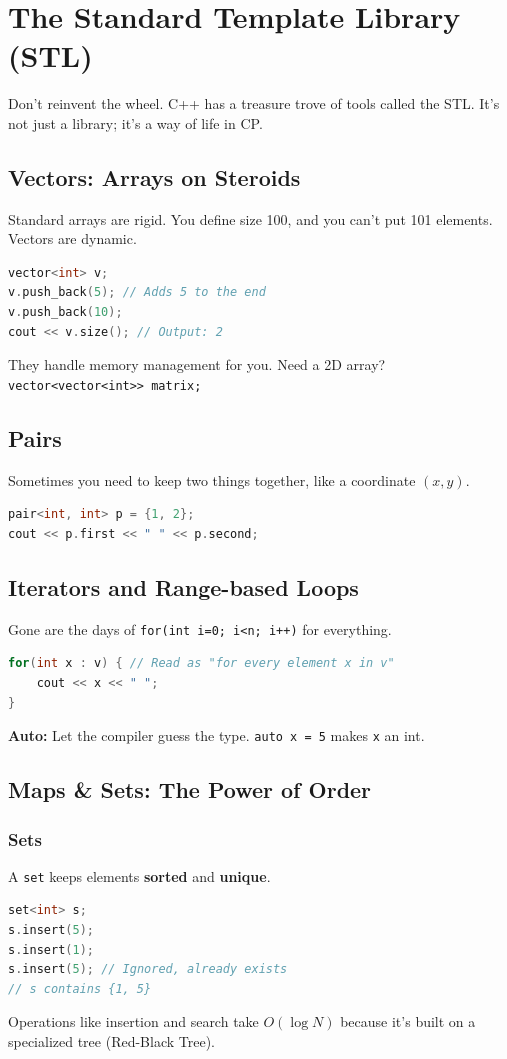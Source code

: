 \documentclass[12pt, a4paper]{report}
\begin{document}
\chapter{The Standard Template Library (STL)}
Don't reinvent the wheel. C++ has a treasure trove of tools called the STL. It's not just a library; it's a way of life in CP.

\section{Vectors: Arrays on Steroids}
Standard arrays are rigid. You define size 100, and you can't put 101 elements. Vectors are dynamic.
\begin{lstlisting}[language=C++]
vector<int> v; 
v.push_back(5); // Adds 5 to the end
v.push_back(10);
cout << v.size(); // Output: 2
\end{lstlisting}
They handle memory management for you. Need a 2D array?
\texttt{vector<vector<int>> matrix;}

\section{Pairs}
Sometimes you need to keep two things together, like a coordinate $(x, y)$.
\begin{lstlisting}[language=C++]
pair<int, int> p = {1, 2};
cout << p.first << " " << p.second;
\end{lstlisting}

\section{Iterators and Range-based Loops}
Gone are the days of \texttt{for(int i=0; i<n; i++)} for everything.
\begin{lstlisting}[language=C++]
for(int x : v) { // Read as "for every element x in v"
    cout << x << " ";
}
\end{lstlisting}
\textbf{Auto:} Let the compiler guess the type. \texttt{auto x = 5} makes \texttt{x} an int.

\section{Maps \& Sets: The Power of Order}
\subsection{Sets}
A \texttt{set} keeps elements \textbf{sorted} and \textbf{unique}.
\begin{lstlisting}[language=C++]
set<int> s;
s.insert(5);
s.insert(1);
s.insert(5); // Ignored, already exists
// s contains {1, 5}
\end{lstlisting}
Operations like insertion and search take $O(\log N)$ because it's built on a specialized tree (Red-Black Tree).
\end{document}
